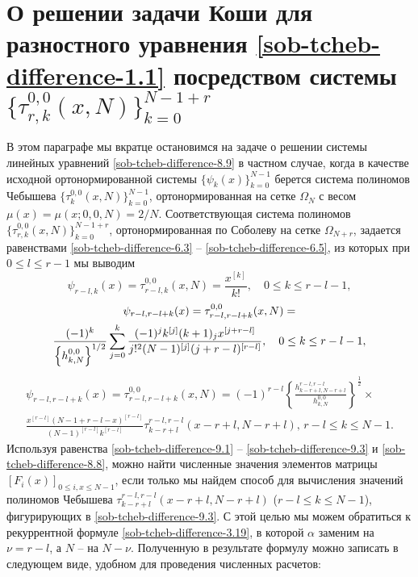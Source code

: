 \section{О  решении задачи Коши для разностного уравнения \eqref{sob-tcheb-difference-1.1} посредством системы $\{ \tau_{r,k}^{0,0}(x,N)\}_{k=0}^{N-1+r} $}
В этом параграфе мы вкратце остановимся на задаче о решении системы линейных уравнений \eqref{sob-tcheb-difference-8.9} в частном случае, когда в качестве исходной  ортонормированной системы  $\{\psi_k(x)\}_{k=0}^{N-1}$ берется система полиномов Чебышева
$\{\tau_k^{0,0}(x,N)\}_{k=0}^{N-1} $, ортонормированная на сетке $\Omega_{N}$ с весом $\mu(x)=\mu(x;0,0,N)=2/N$. Соответствующая  система полиномов
$\{\tau_{r,k}^{0,0}(x,N)\}_{k=0}^{N-1+r}$, ортонормированная по Соболеву на сетке $\Omega_{N+r}$, задается равенствами  \eqref{sob-tcheb-difference-6.3} -- \eqref{sob-tcheb-difference-6.5}, из которых при $0\le l\le r-1$ мы выводим
\begin{equation}\label{sob-tcheb-difference-9.1}
\psi_{r-l,k}(x)=\tau_{r-l,k}^{0,0}(x,N)=\frac{x^{[k]}}{k!},\quad 0\le k\le r-l-1,
   \end{equation}
\begin{multline}\label{sob-tcheb-difference-9.2}
\psi_{r-l,r-l+k}(x)=\tau_{r-l,r-l+k}^{0,0}(x,N)=\\
{(-1)^k\over
\left\{h_{k,N}^{0,0}\right\}^{1/2}}
\sum_{j=0}^k
{(-1)^jk^{[j]}(k+1)_jx^{[j+r-l]}\over
 j!^2(N-1)^{[j]}(j+r-l)^{[r-l]}},\quad 0\le k\le r-l-1,
\end{multline}
\begin{multline}\label{sob-tcheb-difference-9.3}
\psi_{r-l,r-l+k}(x)=\tau_{r-l,r-l+k}^{0,0}(x,N)=
(-1)^{r-l}\left\{\frac{h_{k-r+l,N-r+l}^{r-l,r-l}}{h_{k,N}^{0,0}}\right\}^{\frac12}\times\\
\frac{x^{[r-l]}(N-1+r-l-x)^{[r-l]}}{(N-1)^{[r-l]}k^{[r-l]}}
\tau_{k-r+l}^{r-l,r-l}(x-r+l,N-r+l),\,r-l\le k\le N-1.
\end{multline}
Используя равенства \eqref{sob-tcheb-difference-9.1} -- \eqref{sob-tcheb-difference-9.3} и \eqref{sob-tcheb-difference-8.8}, можно найти численные значения элементов матрицы $[F_i(x)]_{0\le i,x\le N-1}$, если только мы найдем  способ для вычисления значений полиномов Чебышева $\tau_{k-r+l}^{r-l,r-l}(x-r+l,N-r+l)$ ($r-l\le k\le N-1$), фигурирующих в \eqref{sob-tcheb-difference-9.3}. С этой целью мы можем обратиться к рекуррентной формуле \eqref{sob-tcheb-difference-3.19}, в которой $\alpha$ заменим на $\nu=r-l$, а $N$ -- на $N-\nu$. Полученную в результате формулу можно записать в следующем виде, удобном для проведения численных расчетов:
